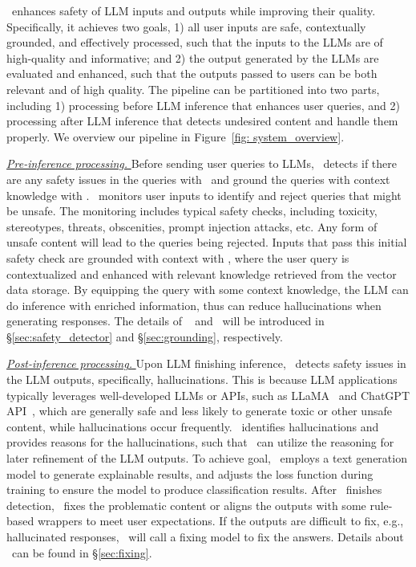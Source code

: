 \goodname~enhances safety of LLM inputs and outputs while improving their quality. Specifically, it achieves two goals, 1) all user inputs are safe, contextually grounded, and effectively processed, such that the inputs to the LLMs are of high-quality and informative; and 2) the output generated by the LLMs are evaluated and enhanced, such that the outputs passed to users can be both relevant and of high quality. 
The pipeline can be partitioned into two parts, including 
1) processing before LLM inference that enhances user queries, and 2) processing after LLM inference that detects undesired content and handle them properly. We overview our pipeline in Figure~\ref{fig: system_overview}.


\noindent\underline{\textit{Pre-inference processing. }}
Before sending user queries to LLMs, \goodname~detects if there are any safety issues in the queries with \detection~and ground the queries with context knowledge with \grounding. 
\detection~monitors user inputs to identify and reject queries that might be unsafe. The monitoring includes typical safety checks, including toxicity, stereotypes, threats, obscenities, prompt injection attacks, etc. Any form of unsafe content will lead to the queries being rejected. 
Inputs that pass this initial safety check are grounded with context with \grounding, where the user query is contextualized and enhanced with relevant knowledge retrieved from the vector data storage. By equipping the query with some context knowledge, the LLM can do inference with enriched information, thus can reduce hallucinations when generating responses. The details of \detection~ and \grounding~will be introduced in \S\ref{sec:safety_detector} and \S\ref{sec:grounding}, respectively.




\noindent\underline{\textit{Post-inference processing. }}
Upon LLM finishing inference, \detection~detects safety issues in the LLM outputs, specifically, hallucinations. This is because LLM applications typically leverages well-developed LLMs or APIs, such as LLaMA~\citep{touvron2023llama} and ChatGPT API~\citep{openai-data-paper}, which are generally safe and less likely to generate toxic or other unsafe content, while hallucinations occur frequently. \detection~identifies hallucinations and provides reasons for the hallucinations, such that \goodname~can utilize the reasoning for later refinement of the LLM outputs. To achieve goal, \goodname~employs a text generation model to generate explainable results, and adjusts the loss function during training to ensure the model to produce classification results. 
After \detection~finishes detection, \fixing~fixes the problematic content or aligns the outputs with some rule-based wrappers to meet user expectations. 
If the outputs are difficult to fix, e.g., hallucinated responses, 
\fixing~will call a fixing model to fix the answers. Details about \fixing~can be found in \S\ref{sec:fixing}.
